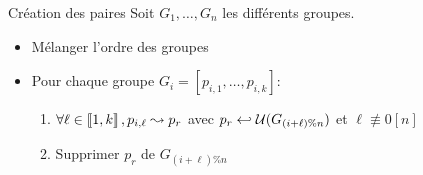 \documentclass[10pt, compress]{beamer}
\begin{document}
  \begin{frame}{Création des paires}
    Soit \(G_1,\ldots,G_n\) les différents groupes.
    \begin{itemize}[<+- | alert@+>]
      \item Mélanger l'ordre des groupes
      \item Pour chaque groupe \(G_i = [p_{i, 1}, \ldots, p_{i, k}]\):
      \begin{enumerate}[<+- | alert@+>]
        \item \(\forall \ell \in \left\llbracket1, k\right\rrbracket, p_{i, \ell} \leadsto p_r\) avec \(p_r\hookleftarrow\mathcal{U}(G_{(i+\ell)\%n})\) et \(\ell \not \equiv 0 [n]\)
        \item Supprimer \(p_r\) de \(G_{(i+\ell)\%n}\)
      \end{enumerate}
    \end{itemize}
  \end{frame}
\end{document}
